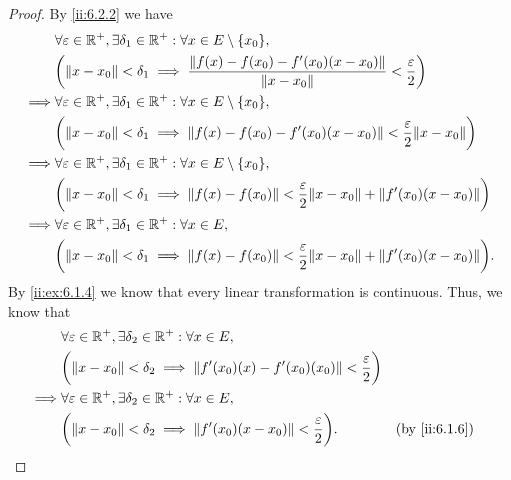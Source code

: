 \begin{proof}
  By \cref{ii:6.2.2} we have
  \begin{align*}
             & \forall \varepsilon \in \R^+, \exists \delta_1 \in \R^+ : \forall x \in E \setminus \set{x_0},                                             \\
             & \bigg(\norm*{x - x_0} < \delta_1 \implies \dfrac{\norm*{f(x) - f(x_0) - f'(x_0)(x - x_0)}}{\norm*{x - x_0}} < \dfrac{\varepsilon}{2}\bigg) \\
    \implies & \forall \varepsilon \in \R^+, \exists \delta_1 \in \R^+ : \forall x \in E \setminus \set{x_0},                                             \\
             & \bigg(\norm*{x - x_0} < \delta_1 \implies \norm*{f(x) - f(x_0) - f'(x_0)(x - x_0)} < \dfrac{\varepsilon}{2} \norm*{x - x_0}\bigg)          \\
    \implies & \forall \varepsilon \in \R^+, \exists \delta_1 \in \R^+ : \forall x \in E \setminus \set{x_0},                                             \\
             & \bigg(\norm*{x - x_0} < \delta_1 \implies \norm*{f(x) - f(x_0)} < \dfrac{\varepsilon}{2} \norm*{x - x_0} + \norm*{f'(x_0)(x - x_0)}\bigg)  \\
    \implies & \forall \varepsilon \in \R^+, \exists \delta_1 \in \R^+ : \forall x \in E,                                                                 \\
             & \bigg(\norm*{x - x_0} < \delta_1 \implies \norm*{f(x) - f(x_0)} < \dfrac{\varepsilon}{2} \norm*{x - x_0} + \norm*{f'(x_0)(x - x_0)}\bigg).
  \end{align*}
  By \cref{ii:ex:6.1.4} we know that every linear transformation is continuous.
  Thus, we know that
  \begin{align*}
             & \forall \varepsilon \in \R^+, \exists \delta_2 \in \R^+ : \forall x \in E,                                                    \\
             & \bigg(\norm*{x - x_0} < \delta_2 \implies \norm*{f'(x_0)(x) - f'(x_0)(x_0)} < \dfrac{\varepsilon}{2}\bigg)                    \\
    \implies & \forall \varepsilon \in \R^+, \exists \delta_2 \in \R^+ : \forall x \in E,                                                    \\
             & \bigg(\norm*{x - x_0} < \delta_2 \implies \norm*{f'(x_0)(x - x_0)} < \dfrac{\varepsilon}{2}\bigg).         &  & \by{ii:6.1.6}
  \end{align*}

\end{proof}
